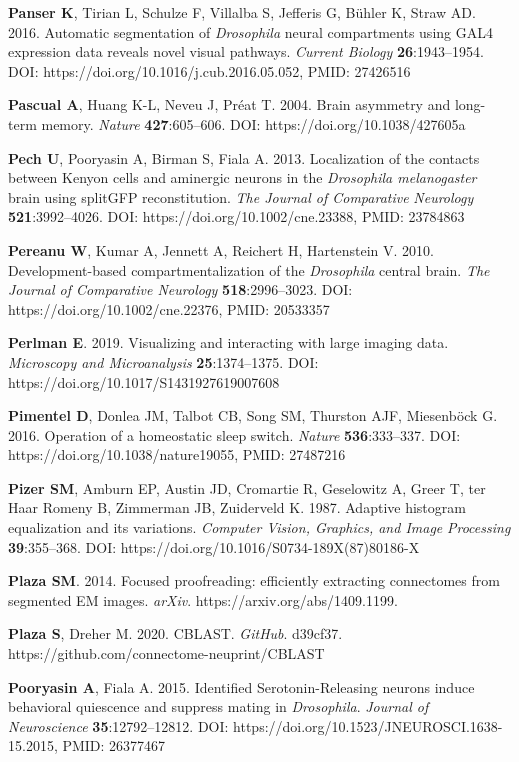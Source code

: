 \documentclass{article}
\begin{document}
\begin{hangpars}
\textbf{Panser K}, Tirian L, Schulze F, Villalba S, Jefferis G, Bühler K, Straw AD. 2016. Automatic segmentation of \emph{Drosophila} neural compartments using GAL4 expression data reveals novel visual pathways. \emph{Current Biology} \textbf{26}:1943–1954. DOI: https://doi.org/10.1016/j.cub.2016.05.052, PMID: 27426516

\textbf{Pascual A}, Huang K-L, Neveu J, Préat T. 2004. Brain asymmetry and long-term memory. \emph{Nature} \textbf{427}:605–606. DOI: https://doi.org/10.1038/427605a

\textbf{Pech U}, Pooryasin A, Birman S, Fiala A. 2013. Localization of the contacts between Kenyon cells and aminergic neurons in the \emph{Drosophila melanogaster} brain using splitGFP reconstitution. \emph{The Journal of Comparative} \emph{Neurology} \textbf{521}:3992–4026. DOI: https://doi.org/10.1002/cne.23388, PMID: 23784863

\textbf{Pereanu W}, Kumar A, Jennett A, Reichert H, Hartenstein V. 2010. Development-based compartmentalization of the \emph{Drosophila} central brain. \emph{The Journal of Comparative Neurology} \textbf{518}:2996–3023. DOI: https://doi.org/10.1002/cne.22376, PMID: 20533357

\textbf{Perlman E}. 2019. Visualizing and interacting with large imaging data. \emph{Microscopy and Microanalysis} \textbf{25}:1374–1375. DOI: https://doi.org/10.1017/S1431927619007608

\textbf{Pimentel D}, Donlea JM, Talbot CB, Song SM, Thurston AJF, Miesenböck G. 2016. Operation of a homeostatic sleep switch. \emph{Nature} \textbf{536}:333–337. DOI: https://doi.org/10.1038/nature19055, PMID: 27487216

\textbf{Pizer SM}, Amburn EP, Austin JD, Cromartie R, Geselowitz A, Greer T, ter Haar Romeny B, Zimmerman JB, Zuiderveld K. 1987. Adaptive histogram equalization and its variations. \emph{Computer Vision, Graphics, and Image} \emph{Processing} \textbf{39}:355–368. DOI: https://doi.org/10.1016/S0734-189X(87)80186-X

\textbf{Plaza SM}. 2014. Focused proofreading: efficiently extracting connectomes from segmented EM images. \emph{arXiv}. https://arxiv.org/abs/1409.1199.

\textbf{Plaza S}, Dreher M. 2020. CBLAST. \emph{GitHub}. d39cf37. https://github.com/connectome-neuprint/CBLAST

\textbf{Pooryasin A}, Fiala A. 2015. Identified Serotonin-Releasing neurons induce behavioral quiescence and suppress mating in \emph{Drosophila}. \emph{Journal of Neuroscience} \textbf{35}:12792–12812. DOI: https://doi.org/10.1523/JNEUROSCI.1638-15.2015, PMID: 26377467


\end{hangpars}
\end{document}

